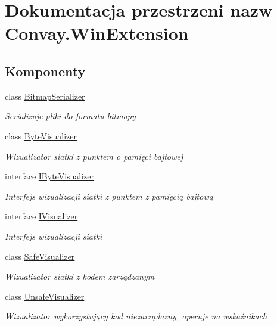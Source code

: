 \hypertarget{namespace_convay_1_1_win_extension}{}\section{Dokumentacja przestrzeni nazw Convay.\+Win\+Extension}
\label{namespace_convay_1_1_win_extension}
\subsection*{Komponenty}
\begin{DoxyCompactItemize}
\item 
class \hyperlink{class_convay_1_1_win_extension_1_1_bitmap_serializer}{Bitmap\+Serializer}
\begin{DoxyCompactList}\small\item\em Serializuje pliki do formatu bitmapy \end{DoxyCompactList}\item 
class \hyperlink{class_convay_1_1_win_extension_1_1_byte_visualizer}{Byte\+Visualizer}
\begin{DoxyCompactList}\small\item\em Wizualizator siatki z punktem o pamięci bajtowej \end{DoxyCompactList}\item 
interface \hyperlink{interface_convay_1_1_win_extension_1_1_i_byte_visualizer}{I\+Byte\+Visualizer}
\begin{DoxyCompactList}\small\item\em Interfejs wizualizacji siatki z punktem z pamięcią bajtową \end{DoxyCompactList}\item 
interface \hyperlink{interface_convay_1_1_win_extension_1_1_i_visualizer}{I\+Visualizer}
\begin{DoxyCompactList}\small\item\em Interfejs wizualizacji siatki \end{DoxyCompactList}\item 
class \hyperlink{class_convay_1_1_win_extension_1_1_safe_visualizer}{Safe\+Visualizer}
\begin{DoxyCompactList}\small\item\em Wizualizator siatki z kodem zarządzanym \end{DoxyCompactList}\item 
class \hyperlink{class_convay_1_1_win_extension_1_1_unsafe_visualizer}{Unsafe\+Visualizer}
\begin{DoxyCompactList}\small\item\em Wizualizator wykorzystujący kod niezarządazny, operuje na wskaźnikach \end{DoxyCompactList}\end{DoxyCompactItemize}
